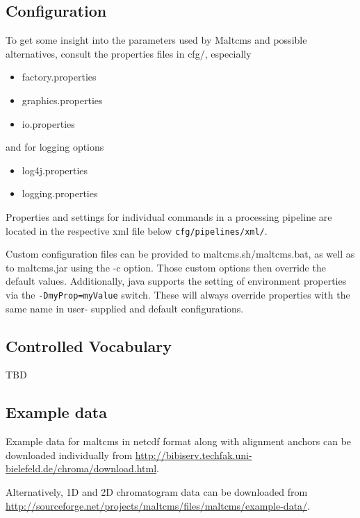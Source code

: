 \subsection{Configuration}
To get some insight into the parameters used by Maltcms and possible
alternatives, consult the properties files in cfg/, especially

\begin{itemize}
    \item factory.properties
    \item graphics.properties
    \item io.properties
\end{itemize}

and for logging options

\begin{itemize}
    \item log4j.properties
    \item logging.properties
\end{itemize}

Properties and settings for individual commands in a processing
pipeline are located in the respective xml file below \verb|cfg/pipelines/xml/|.

Custom configuration files can be provided to maltcms.sh/maltcms.bat,
as well as to maltcms.jar using the -c option. Those custom options
then override the default values. Additionally, java supports the 
setting of environment properties via the \verb|-DmyProp=myValue| switch. 
These will always override properties with the same name in user-
supplied and default configurations.

\subsection{Controlled Vocabulary}
TBD

\subsection{Example data}
Example data for maltcms in netcdf format along with alignment
anchors can be downloaded individually from
\url{http://bibiserv.techfak.uni-bielefeld.de/chroma/download.html}.

Alternatively, 1D and 2D chromatogram data can be downloaded from \url{http://sourceforge.net/projects/maltcms/files/maltcms/example-data/}.